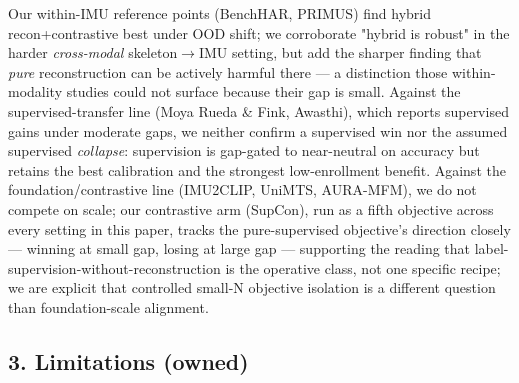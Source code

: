 Our within-IMU reference points (BenchHAR, PRIMUS) find hybrid recon+contrastive best under OOD shift; we corroborate "hybrid is robust" in the harder \textit{cross-modal} skeleton$\rightarrow$IMU setting, but add the sharper finding that \textit{pure} reconstruction can be actively harmful there --- a distinction those within-modality studies could not surface because their gap is small. Against the supervised-transfer line (Moya Rueda \& Fink, Awasthi), which reports supervised gains under moderate gaps, we neither confirm a supervised win nor the assumed supervised \textit{collapse}: supervision is gap-gated to near-neutral on accuracy but retains the best calibration and the strongest low-enrollment benefit. Against the foundation/contrastive line (IMU2CLIP, UniMTS, AURA-MFM), we do not compete on scale; our contrastive arm (SupCon), run as a fifth objective across every setting in this paper, tracks the pure-supervised objective's direction closely --- winning at small gap, losing at large gap --- supporting the reading that label-supervision-without-reconstruction is the operative class, not one specific recipe; we are explicit that controlled small-N objective isolation is a different question than foundation-scale alignment.

\subsection{3. Limitations (owned)}

